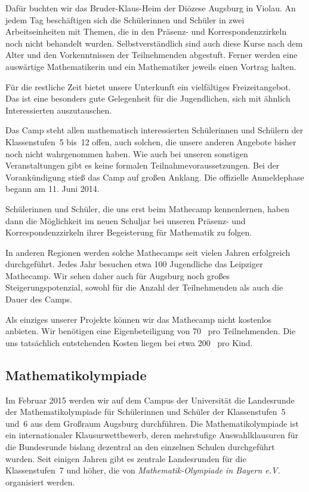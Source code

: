 \documentclass[12pt]{zettel}
\begin{document}
Dafür buchten wir das Bruder-Klaus-Heim der Diözese Augsburg in Violau. An jedem Tag beschäftigen sich die Schülerinnen und Schüler in zwei
Arbeitseinheiten mit Themen, die in den Präsenz- und Korrespondenzzirkeln noch
nicht behandelt wurden. Selbstverständlich sind auch diese Kurse nach dem Alter
und den Vorkenntnissen der Teilnehmenden abgestuft. Ferner
werden eine auswärtige Mathematikerin und ein Mathematiker jeweils einen
Vortrag halten.

Für die restliche Zeit bietet unsere Unterkunft ein vielfältiges
Freizeitangebot. Das ist eine besonders gute Gelegenheit für die Jugendlichen,
sich mit ähnlich Interessierten auszutauschen.

Das Camp steht allen mathematisch interessierten Schülerinnen und Schülern der
Klassenstufen~5 bis~12 offen, auch solchen, die unsere anderen Angebote bisher
noch nicht wahrgenommen haben. Wie auch bei unseren sonstigen Veranstaltungen gibt es keine formalen Teilnahmevoraussetzungen. Bei der Vorankündigung stieß das Camp auf großen
Anklang. Die offizielle Anmeldephase begann am 11. Juni 2014.

Schülerinnen und Schüler, die uns erst beim Mathecamp kennenlernen, haben dann die Möglichkeit im neuen Schuljar bei unseren Präsenz- und Korrespondenzzirkeln ihrer Begeisterung für Mathematik zu folgen.

In anderen Regionen werden solche Mathecamps seit vielen Jahren erfolgreich durchgeführt. Jedes Jahr besuchen etwa 100 Jugendliche das Leipziger Mathecamp. Wir sehen daher auch für Augsburg noch großes Steigerungspotenzial, sowohl für die Anzahl der Teilnehmenden als auch die Dauer des Camps.

Als einziges unserer Projekte können wir das Mathecamp nicht kostenlos
anbieten. Wir benötigen eine Eigenbeteiligung von 70~\texteuro{} pro
Teilnehmenden. Die uns tatsächlich entstehenden Kosten liegen bei etwa
200~\texteuro{} pro Kind.

\subsection{Mathematikolympiade}

Im Februar 2015 werden wir auf dem Campus der Universität die Landesrunde der Mathematikolympiade für Schülerinnen und Schüler der Klassenstufen~5 und~6 aus dem Großraum
Augsburg durchführen. Die Mathematikolympiade ist ein internationaler Klausurwettbewerb, deren mehrstufige Auswahlklausuren für die Bundesrunde
bislang dezentral an den einzelnen Schulen durchgeführt wurden. Seit einigen
Jahren gibt es zentrale Landesrunden für die Klassenstufen~7 und höher, die von
\emph{Mathematik-Olympiade in Bayern e.V.} organisiert werden.
\end{document}
